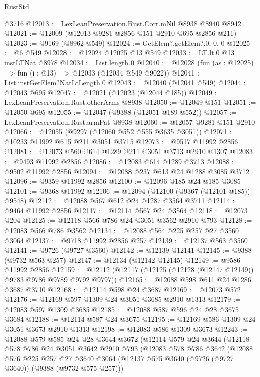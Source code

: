 \begin{lexlean}{RustStd}
\begin{coremodule}
    @3716
@12013 := LexLeanPreservation.Rust.Corr.mNil @8938 @8940 @8942
@12021 := @12009 (@12013 @9281 @2856 @151 @2910 @695 @2856 @211)
@12023 := @9169 (@8962 @549)
@12024 := GetElem?.getElem?.{0, 0, 0}
@12025 := @6 @549
@12028 := @12024 @12025 @13 @549
@12033 := LT.lt.{0} @13 instLTNat @8978
@12034 := List.length.{0}
@12040 := @12028 (fun (as : @12025) => fun (i : @13) => @12033 (@12034 @549 @9022))
@12041 := List.instGetElem?NatLtLength.{0}
@12043 := @12040 (@12041 @549)
@12044 := @12043 @695
@12047 := @12021 (@12023 (@12044 @185))
@12049 := LexLeanPreservation.Rust.otherArms @8938
@12050 := @12049 @151
@12051 := @12050 @695
@12055 := @12047 (@9388 (@12051 @189 @552))
@12057 := LexLeanPreservation.Rust.armPat @8938
@12060 := @12057 @9281 @151 @2910
@12066 := @12055 (@9297 (@12060 @552 @555 @3635 @3051))
@12071 := @10233 @11992 @615 @211 @3051 @3715
@12073 := @9517 @11992 @2856
@12081 := @12073 @560 @614 @1289 @211 @3051 @3713 @2910 @1307
@12083 := @9493 @11992 @2856
@12086 := @12083 @614 @1289 @3713
@12088 := @9502 @11992 @2856
@12094 := @12088 @237 @613 @24 @1288 @3085 @3712
@12096 := @9359 @11992 @2856
@12100 := @12096 @185 @24 @185 @3085
@12101 := @9368 @11992
@12106 := @12094 (@12100 (@9367 (@12101 @185)) @9548)
@12112 := @12088 @567 @612 @24 @1287 @3564 @3711
@12114 := @9464 @11992 @2856
@12117 := @12114 @567 @24 @3564
@12118 := @12073 @204
@12125 := @12118 @566 @786 @24 @3051 @3562 @2910 @793
@12128 := @12083 @566 @786 @3562
@12134 := @12088 @564 @225 @257 @27 @3560 @3064
@12137 := @9718 @11992 @2856 @257
@12139 := @12137 @563 @3560
@12141 := @9726 (@9727 @3560)
@12142 := @12139 @12141
@12145 := @9388 (@9732 @563 @257)
@12147 := @12134 (@12142 @12145)
@12149 := @9586 @11992 @2856
@12159 := @12112 (@12117 (@12125 (@12128 (@12147 @12149)) @9783 @9786 @9789 @9792 @9797))
@12165 := @12088 @598 @611 @24 @1286 @3687 @3710
@12168 := @12114 @598 @24 @3687
@12169 := @12073 @572
@12176 := @12169 @597 @1309 @24 @3051 @3685 @2910 @1313
@12179 := @12083 @597 @1309 @3685
@12185 := @12088 @587 @596 @24 @28 @3675 @3684
@12188 := @12114 @587 @24 @3675
@12195 := @12169 @586 @1309 @24 @3051 @3673 @2910 @1313
@12198 := @12083 @586 @1309 @3673
@12243 := @12088
    @579
    @585
    @24
    @28
    @3644
    @3672
    (@12114
      @579
      @24
      @3644
      (@12118
        @578
        @786
        @24
        @3051
        @3642
        @2910
        @793
        (@12083
          @578
          @786
          @3642
          (@12088
            @576
            @225
            @257
            @27
            @3640
            @3064
            (@12137 @575 @3640 (@9726 (@9727 @3640)) (@9388 (@9732 @575 @257)))

\end{coremodule}
\end{lexlean}
